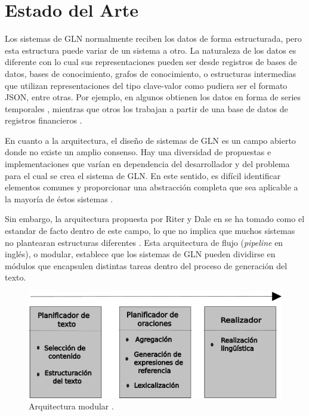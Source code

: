 \chapter{Estado del Arte}\label{chapter:state-of-the-art}


    Los sistemas de GLN normalmente reciben los datos de forma estructurada, pero esta estructura puede variar de un sistema a otro.
La naturaleza de los datos es diferente con lo cual sus representaciones pueden ser desde registros de bases de datos, bases de conocimiento, 
grafos de conocimiento, o estructuras intermedias que utilizan representaciones del tipo clave-valor como pudiera ser el formato JSON, entre otras. 
Por ejemplo, en algunos obtienen los datos en forma de series temporales , mientras que otros los trabajan a 
partir de una base de datos de registros financieros .

En cuanto a la arquitectura, el diseño de sistemas de GLN es un campo abierto donde no existe un amplio consenso. Hay una diversidad de propuestas e implementaciones 
que varían en dependencia del desarrollador y del problema para el cual se crea el sistema de GLN. En este sentido, es difícil identificar elementos comunes y proporcionar una abstracción 
completa que sea aplicable a la mayoría de éstos sistemas .


 Sin embargo, la arquitectura propuesta por Riter y Dale en  se ha tomado como el estandar de facto 
dentro de este campo, lo que no implica que muchos sistemas no plantearan estructuras diferentes . 
Esta arquitectura de flujo (\emph{pipeline} en inglés), o modular, establece que los sistemas de GLN pueden dividirse en módulos 
que encapsulen distintas tareas dentro del proceso de generación del texto.

    

    \begin{figure}[!]
        \begin{center}
            \includegraphics[width=\textwidth]{Graphics/arquitecturaPipeline_Capa 1.png}
        \end{center}
        \caption{Arquitectura modular .}
        \label{fig_arq_Pipeline}
    \end{figure}


